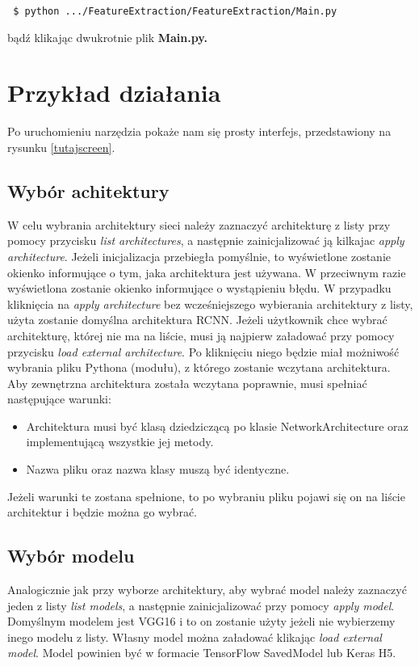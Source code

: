 \documentclass[a4paper,twoside,12pt]{book}
\begin{document}
{{\lstinline| $ python .../FeatureExtraction/FeatureExtraction/Main.py| }

{bądź klikając dwukrotnie plik \textbf{Main.py.}}
\section{Przykład działania}
{Po uruchomieniu narzędzia pokaże nam się prosty interfejs, przedstawiony na rysunku \ref{tutajscreen}.}
\subsection{Wybór achitektury}
{W celu wybrania architektury sieci należy zaznaczyć architekturę z listy przy pomocy przycisku \emph{list architectures}, a następnie zainicjalizować ją kilkajac \emph{apply architecture}. Jeżeli inicjalizacja przebiegła pomyślnie, to wyświetlone zostanie okienko informujące o tym, jaka architektura jest używana. W przeciwnym razie wyświetlona zostanie okienko informujące o wystąpieniu błędu. W przypadku kliknięcia na \emph{apply architecture} bez wcześniejszego wybierania architektury z listy, użyta zostanie domyślna architektura RCNN. Jeżeli użytkownik chce wybrać architekturę, której nie ma na liście, musi ją najpierw załadować przy pomocy przycisku  \emph{load external architecture}. Po kliknięciu niego będzie miał możniwość wybrania pliku Pythona (modułu), z którego zostanie wczytana architektura. Aby zewnętrzna architektura została wczytana poprawnie, musi spełniać następujące warunki:
\begin{itemize}
\item Architektura musi być klasą dziedziczącą po klasie NetworkArchitecture oraz implementującą wszystkie jej metody.
\item Nazwa pliku oraz nazwa klasy muszą być identyczne.
\end{itemize}
Jeżeli warunki te zostana spełnione, to po wybraniu pliku pojawi się on na liście architektur i będzie można go wybrać.}
\subsection{Wybór modelu}
{Analogicznie jak przy wyborze architektury, aby wybrać model należy zaznaczyć jeden z listy \emph{list models}, a następnie zainicjalizować przy pomocy \emph{apply model}. Domyślnym modelem jest VGG16 i to on zostanie użyty jeżeli nie wybierzemy inego modelu z listy. Własny model można załadować klikając \emph{load external model}. Model powinien być w formacie TensorFlow SavedModel lub Keras H5.}
}
\end{document}
